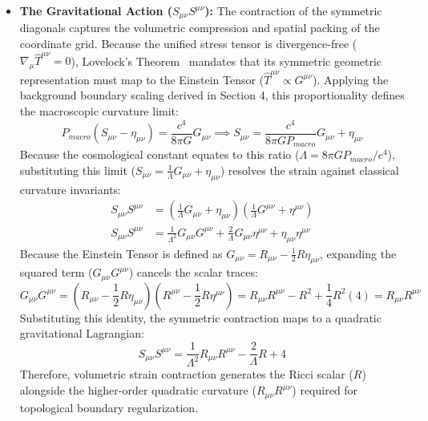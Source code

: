 \begin{itemize}
    \item \textbf{The Gravitational Action ($S_{\mu\nu} S^{\mu\nu}$):} The contraction of the symmetric diagonals captures the volumetric compression and spatial packing of the coordinate grid. Because the unified stress tensor is divergence-free ($\nabla_\mu \hat{T}^{\mu\nu} = 0$), Lovelock's Theorem~\cite{Lovelock1971} mandates that its symmetric geometric representation must map to the Einstein Tensor ($\hat{T}^{\mu\nu} \propto G^{\mu\nu}$). Applying the background boundary scaling derived in Section 4, this proportionality defines the macroscopic curvature limit:
    \begin{equation}
        P_{macro} (S_{\mu\nu} - \eta_{\mu\nu}) = \frac{c^4}{8\pi G}G_{\mu\nu} \implies S_{\mu\nu} = \frac{c^4}{8\pi G P_{macro}}G_{\mu\nu} + \eta_{\mu\nu} 
    \end{equation}
    Because the cosmological constant equates to this ratio ($\Lambda = 8\pi G P_{macro} / c^4$), substituting this limit ($S_{\mu\nu} = \frac{1}{\Lambda} G_{\mu\nu} + \eta_{\mu\nu}$) resolves the strain against classical curvature invariants:
    \begin{align}
        S_{\mu\nu} S^{\mu\nu} &= \left( \frac{1}{\Lambda} G_{\mu\nu} + \eta_{\mu\nu} \right) \left( \frac{1}{\Lambda} G^{\mu\nu} + \eta^{\mu\nu} \right) \nonumber \\
        S_{\mu\nu} S^{\mu\nu} &= \frac{1}{\Lambda^2} G_{\mu\nu} G^{\mu\nu} + \frac{2}{\Lambda} G_{\mu\nu} \eta^{\mu\nu} + \eta_{\mu\nu} \eta^{\mu\nu}
    \end{align}
    Because the Einstein Tensor is defined as $G_{\mu\nu} = R_{\mu\nu} - \frac{1}{2}R \eta_{\mu\nu}$, expanding the squared term ($G_{\mu\nu} G^{\mu\nu}$) cancels the scalar traces: 
    \begin{equation}
        G_{\mu\nu} G^{\mu\nu} = \left( R_{\mu\nu} - \frac{1}{2} R \eta_{\mu\nu} \right)\left( R^{\mu\nu} - \frac{1}{2} R \eta^{\mu\nu} \right) = R_{\mu\nu} R^{\mu\nu} - R^2 + \frac{1}{4}R^2(4) = R_{\mu\nu} R^{\mu\nu}
    \end{equation}
    Substituting this identity, the symmetric contraction maps to a quadratic gravitational Lagrangian:
    \begin{equation}
        S_{\mu\nu} S^{\mu\nu} = \frac{1}{\Lambda^2} R_{\mu\nu} R^{\mu\nu} - \frac{2}{\Lambda} R + 4
    \end{equation}
    Therefore, volumetric strain contraction generates the Ricci scalar ($R$) alongside the higher-order quadratic curvature ($R_{\mu\nu} R^{\mu\nu}$) required for topological boundary regularization.
    

\end{itemize}
